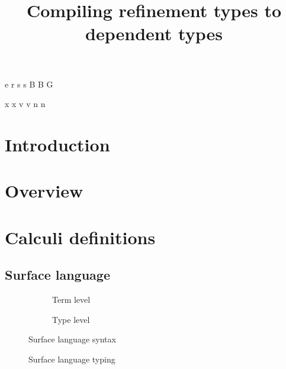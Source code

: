 \documentclass[a4paper]{article}
\begin{document}
\newnonterm e \varepsilon
{}
\newnonterm r \rho
{}
\newnonterm s s
\newnonterm B B
\newnonterm G \Gamma
{}

\newgterm x x
\newgterm v v
\newgterm n n


\title{Compiling refinement types to dependent types}

\maketitle

\section{Introduction}

\section{Overview}


\section{Calculi definitions}

\subsection{Surface language}

\begin{figure}[ht]
  \footnotesize
  \begin{subfigure}{.6\textwidth}
    \caption{Term level}
  \end{subfigure}
  \begin{subfigure}{.5\textwidth}
    \caption{Type level}
  \end{subfigure}
  \caption{Surface language syntax}
  \label{fig:surface_syntax}
\end{figure}

\begin{figure}[ht]
  \footnotesize
  \caption{Surface language typing}
  \label{fig:surface_typing}
\end{figure}
\end{document}
